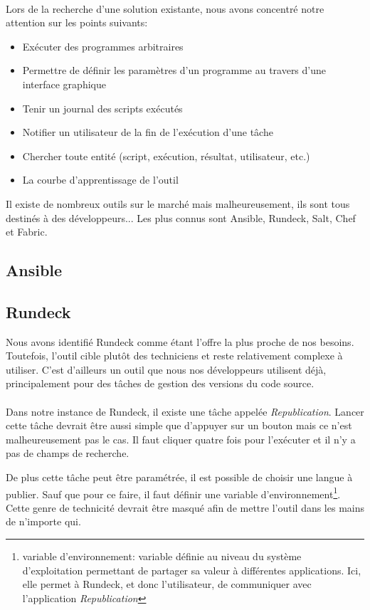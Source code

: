 \paragraph{}
Lors de la recherche d'une solution existante, nous avons concentré notre attention sur les points suivants:
\begin{itemize}
    \item Exécuter des programmes arbitraires
    \item Permettre de définir les paramètres d'un programme au travers d'une interface graphique
    \item Tenir un journal des scripts exécutés
    \item Notifier un utilisateur de la fin de l'exécution d'une tâche
    \item Chercher toute entité (script, exécution, résultat, utilisateur, etc.)
    \item La courbe d'apprentissage de l'outil
\end{itemize}
Il existe de nombreux outils sur le marché mais malheureusement, ils sont tous destinés à des développeurs...
Les plus connus sont Ansible, Rundeck, Salt, Chef et Fabric.

\subsection{Ansible}

\subsection{Rundeck}
Nous avons identifié Rundeck comme étant l'offre la plus proche de nos besoins.
Toutefois, l'outil cible plutôt des techniciens et reste relativement complexe à utiliser.
C'est d'ailleurs un outil que nous nos développeurs utilisent déjà, principalement pour des tâches de gestion des versions du code source.

\paragraph{}
Dans notre instance de Rundeck, il existe une tâche appelée \textit{Republication}.
Lancer cette tâche devrait être aussi simple que d'appuyer sur un bouton mais ce n'est malheureusement pas le cas.
Il faut cliquer quatre fois pour l'exécuter et il n'y a pas de champs de recherche.

De plus cette tâche peut être paramétrée, il est possible de choisir une langue à publier.
Sauf que pour ce faire, il faut définir une variable d'environnement\footnote{variable d'environnement: variable définie au niveau du système d'exploitation permettant de partager sa valeur à différentes applications. Ici, elle permet à Rundeck, et donc l'utilisateur, de communiquer avec l'application \textit{Republication}}.
Cette genre de technicité devrait être masqué afin de mettre l'outil dans les mains de n'importe qui.

